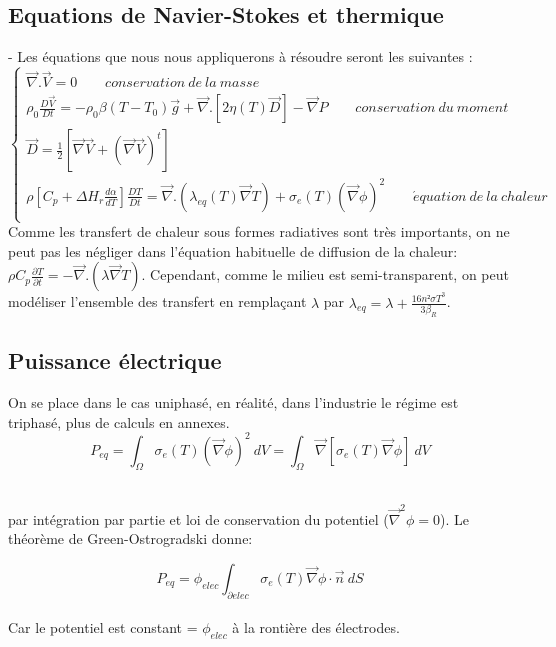 \documentclass[12pt, a4paper, french, BCOR = 0pt, DIV = 10]{scrartcl}
\begin{document}
	\subsection{ Equations de Navier-Stokes et thermique}
	- Les équations que nous nous appliquerons à résoudre seront les suivantes : \\
	\centering
	$$
	\left\{
	\begin{array} {ll} 
		\vec {\nabla}. \vec{V} = 0 ~~~~~~~~~  conservation~de~la~masse\\
		
		\rho_{0} \frac{D\vec{V}}{Dt} = -\rho_{0} \beta (T-T_{0}) \vec{g} + \vec {\nabla} . [ 2 \eta (T) \vec{D}] - \vec {\nabla} P  ~~~~~~~~~ conservation~du~moment \\   
		
		\vec{D} = \frac{1}{2} [\vec{\nabla} \vec{V} + (\vec{\nabla} \vec{V})^t ] \\
		\rho [ C_{p}+ \Delta H_{r} \frac{d\alpha}{dT}] \frac{DT}{Dt} = \vec {\nabla} .  (\lambda_{eq}(T) \vec{\nabla} T ) + \sigma_{e}(T) (\vec \nabla\phi)^2  ~~~~~~~~~ \acute equation~de ~la~chaleur \\
		
		
	\end{array}
	\right. 
	$$
	Comme les transfert de chaleur sous formes radiatives sont très importants, on ne peut pas les négliger dans l'équation habituelle de diffusion de la chaleur: $ \rho C_{p} \frac{\partial T}{\partial t} = - \vec{\nabla} . (\lambda\vec{\nabla}T) $. Cependant, comme le milieu est semi-transparent, on peut modéliser l'ensemble des transfert en remplaçant $\lambda$ par $\lambda_{eq} = \lambda + \frac{16n² \sigma T^{3}}{3\beta_{R}} $.
	\\ [0.5 cm]
	
	
	\subsection{Puissance électrique}
	\raggedright
	On se place dans le cas uniphasé, en réalité, dans l'industrie le régime est triphasé, plus de calculs en annexes. \\ [0.2 cm ]
	\centering
	\[ P_{eq}=\int_\Omega \sigma_{e}(T)(\vec \nabla\phi)^2~dV  = \int_\Omega \vec \nabla[\sigma_{e}(T)\vec \nabla\phi]~dV \]\\
	\raggedright
	par intégration par partie et loi de conservation du potentiel ($ \vec{\nabla}^2 \phi = 0 $). Le théorème de Green-Ostrogradski donne: 
	
	\[ P_{eq}=\phi_{elec} \int_{\partial elec} \sigma_{e}(T)\vec \nabla\phi \cdot \vec{n}~dS\]
	\\
	Car le potentiel est constant = $\phi_{elec} $ à la rontière des électrodes. \\
\end{document}
